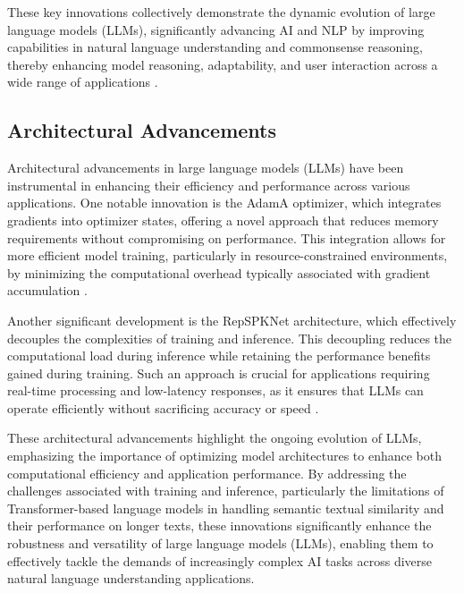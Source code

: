 These key innovations collectively demonstrate the dynamic evolution of large language models (LLMs), significantly advancing AI and NLP by improving capabilities in natural language understanding and commonsense reasoning, thereby enhancing model reasoning, adaptability, and user interaction across a wide range of applications \cite{hsu2023whatsleftconceptgrounding}.


\subsection{Architectural Advancements} \label{subsec:Architectural Advancements}



Architectural advancements in large language models (LLMs) have been instrumental in enhancing their efficiency and performance across various applications. One notable innovation is the AdamA optimizer, which integrates gradients into optimizer states, offering a novel approach that reduces memory requirements without compromising on performance. This integration allows for more efficient model training, particularly in resource-constrained environments, by minimizing the computational overhead typically associated with gradient accumulation \cite{zhang2023adamaccumulationreducememory}.



Another significant development is the RepSPKNet architecture, which effectively decouples the complexities of training and inference. This decoupling reduces the computational load during inference while retaining the performance benefits gained during training. Such an approach is crucial for applications requiring real-time processing and low-latency responses, as it ensures that LLMs can operate efficiently without sacrificing accuracy or speed \cite{ma2021repworksspeakerverification}.



These architectural advancements highlight the ongoing evolution of LLMs, emphasizing the importance of optimizing model architectures to enhance both computational efficiency and application performance. By addressing the challenges associated with training and inference, particularly the limitations of Transformer-based language models in handling semantic textual similarity and their performance on longer texts, these innovations significantly enhance the robustness and versatility of large language models (LLMs), enabling them to effectively tackle the demands of increasingly complex AI tasks across diverse natural language understanding applications. \cite{ginzburg2021selfsuperviseddocumentsimilarityranking}



